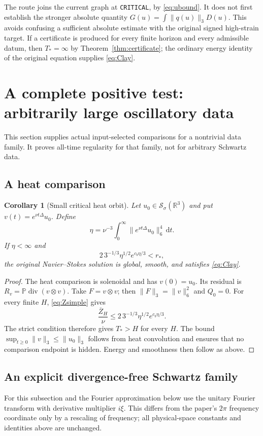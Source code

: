 \documentclass[11pt,a4paper]{article}
\newtheorem{corollary}[theorem]{Corollary}
\theoremstyle{definition}\newtheorem{definition}[theorem]{Definition}
\theoremstyle{remark}\newtheorem{remark}[theorem]{Remark}
\newcommand{\R}{\mathbb R}
\newcommand{\PP}{\mathbb P}
\newcommand{\dd}{\,\mathrm d}
\newcommand{\norm}[1]{\lVert #1\rVert}
\newcommand{\diver}{\operatorname{div}}
\newcommand{\Sch}{\mathcal S_\sigma(\R^3)}
\newcommand{\rstar}{r_*}
\newcommand{\cb}{c_b}
\numberwithin{equation}{section}
\begin{document}
The route joins the current graph at \texttt{CRITICAL}, by \eqref{eq:ubound}. It does not first establish the stronger absolute quantity $G(u)=\int\norm{q(u)}_3D(u)$. This avoids confusing a sufficient absolute estimate with the original signed high-strain target. If a certificate is produced for every finite horizon and every admissible datum, then $T_*=\infty$ by Theorem~\ref{thm:certificate}; the ordinary energy identity of the original equation supplies \eqref{eq:Clay}.

\section{A complete positive test: arbitrarily large oscillatory data}
\label{sec:oscillation}
This section supplies actual input-selected comparisons for a nontrivial data family. It proves all-time regularity for that family, not for arbitrary Schwartz data.

\subsection{A heat comparison}
\begin{corollary}[Small critical heat orbit]\label{cor:heat}
Let $u_0\in\Sch$ and put $v(t)=e^{\nu t\Delta}u_0$. Define
\begin{equation}\label{eq:eta}
 \eta=\nu^{-3}\int_0^\infty\norm{e^{\nu t\Delta}u_0}_6^4\dd t.
\end{equation}
If $\eta<\infty$ and
\begin{equation}\label{eq:heatcriterion}
 2\,3^{-1/3}\eta^{1/2}e^{\cb\eta/3}<\rstar,
\end{equation}
the original Navier--Stokes solution is global, smooth, and satisfies \eqref{eq:Clay}.
\end{corollary}
\begin{proof}
The heat comparison is solenoidal and has $v(0)=u_0$. Its residual is $R_v=\PP\diver(v\otimes v)$. Take $F=v\otimes v$; then $\norm F_3=\norm v_6^2$ and $Q_0=0$. For every finite $H$, \eqref{eq:Zsimple} gives
\[
 \frac{\overline Z_H}{\nu}
 \le2\,3^{-1/3}\eta^{1/2}e^{\cb\eta/3}.
\]
The strict condition therefore gives $T_*>H$ for every $H$. The bound $\sup_{t\ge0}\norm v_3\le\norm{u_0}_3$ follows from heat convolution and ensures that no comparison endpoint is hidden. Energy and smoothness then follow as above.
\end{proof}

\subsection{An explicit divergence-free Schwartz family}
For this subsection and the Fourier approximation below use the unitary Fourier transform with derivative multiplier $i\xi$. This differs from the paper's $2\pi$ frequency coordinate only by a rescaling of frequency; all physical-space constants and identities above are unchanged.
\end{document}
